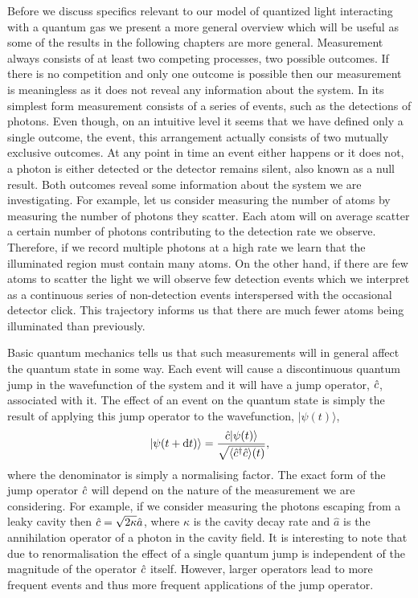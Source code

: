 Before we discuss specifics relevant to our model of quantized light
interacting with a quantum gas we present a more general overview
which will be useful as some of the results in the following chapters
are more general. Measurement always consists of at least two
competing processes, two possible outcomes. If there is no competition
and only one outcome is possible then our measurement is meaningless
as it does not reveal any information about the system. In its
simplest form measurement consists of a series of events, such as the
detections of photons. Even though, on an intuitive level it seems
that we have defined only a single outcome, the event, this
arrangement actually consists of two mutually exclusive outcomes. At
any point in time an event either happens or it does not, a photon is
either detected or the detector remains silent, also known as a null
result. Both outcomes reveal some information about the system we are
investigating. For example, let us consider measuring the number of
atoms by measuring the number of photons they scatter. Each atom will
on average scatter a certain number of photons contributing to the
detection rate we observe. Therefore, if we record multiple photons at
a high rate we learn that the illuminated region must contain many
atoms. On the other hand, if there are few atoms to scatter the light
we will observe few detection events which we interpret as a
continuous series of non-detection events interspersed with the
occasional detector click. This trajectory informs us that there are
much fewer atoms being illuminated than previously.

Basic quantum mechanics tells us that such measurements will in
general affect the quantum state in some way. Each event will cause a
discontinuous quantum jump in the wavefunction of the system and it
will have a jump operator, $\hat{c}$, associated with it. The effect of an
event on the quantum state is simply the result of applying this jump
operator to the wavefunction, $| \psi (t) \rangle$,
\begin{equation}
  \label{eq:jump}
  | \psi(t + \mathrm{d}t) \rangle = \frac{\hat{c} | \psi(t) \rangle}
  {\sqrt{\langle \hat{c}^\dagger \hat{c} \rangle (t)}},
\end{equation}
where the denominator is simply a normalising factor. The exact form
of the jump operator $\hat{c}$ will depend on the nature of the measurement
we are considering. For example, if we consider measuring the photons
escaping from a leaky cavity then $\hat{c} = \sqrt{2 \kappa} \hat{a}$,
where $\kappa$ is the cavity decay rate and $\hat{a}$ is the
annihilation operator of a photon in the cavity field. It is
interesting to note that due to renormalisation the effect of a single
quantum jump is independent of the magnitude of the operator $\hat{c}$
itself. However, larger operators lead to more frequent events and
thus more frequent applications of the jump operator.

